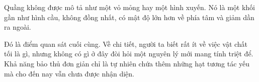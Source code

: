 Quầng không được mô tả như một vỏ mỏng hay một hình xuyến. Nó là một khối gần như hình cầu, không đồng nhất, có mật độ lớn hơn về phía tâm và giảm dần ra ngoài.

\begin{classroomqa}
\end{classroomqa}

Đó là điểm quan sát cuối cùng. Về chi tiết, người ta biết rất ít về việc vật chất tối là gì, nhưng không có gì ở đây đòi hỏi một nguyên lý mới mang tính triệt để. Khả năng bảo thủ đơn giản chỉ là tự nhiên chứa thêm những hạt tương tác yếu mà cho đến nay vẫn chưa được nhận diện.
